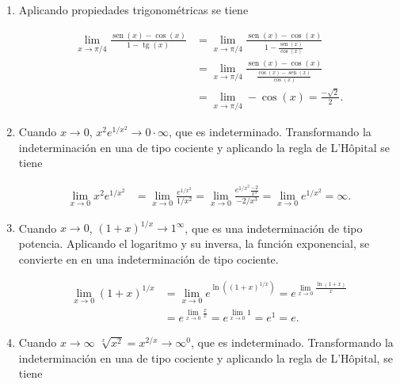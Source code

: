 \documentclass[
  spanish,
  a4paper,
]{scrreport}
\theoremstyle{definition}
\theoremstyle{remark}
\begin{document}
\begin{tcolorbox}
\begin{enumerate}
  \begin{align*}
  \lim_{x\to 0}\frac{\operatorname{sen}(x)-x}{x^3} 
  &= \lim_{x\to 0}\frac{\cos(x) -1}{3x^2} \tag{L'Hôpital} \\
  &= \lim_{x\to 0}\frac{-\sin(x)}{6x} \tag{L'Hôpital} \\
  &= \lim_{x\to 0}\frac{-\cos(x)}{6} \tag{L'Hôpital} \\
  &= -\frac{1}{6}.
  \end{align*}
\item
  Aplicando propiedades trigonométricas se tiene

  \begin{align*}
  \lim_{x\to \pi/4}\frac{\operatorname{sen}(x)-\cos(x)}{1-\operatorname{tg}(x)} &= \lim_{x\to \pi/4}\frac{\operatorname{sen}(x)-\cos(x)}{1-\frac{\operatorname{sen}(x)}{\cos(x)}}\\ 
  & = \lim_{x\to \pi/4}\frac{\operatorname{sen}(x)-\cos(x)}{\frac{\cos(x)-\operatorname{sen}(x)}{\cos(x)}}\\ 
  & = \lim_{x\to \pi/4} -\cos(x) = \frac{-\sqrt{2}}{2}.
  \end{align*}
\item
  Cuando \(x\to 0\), \(x^2e^{1/x^2}\to 0\cdot \infty\), que es
  indeterminado. Transformando la indeterminación en una de tipo
  cociente y aplicando la regla de L'Hôpital se tiene

  \begin{align*}
  \lim_{x\to 0}x^2e^{1/x^2} &= \lim_{x\to 0}\frac{e^{1/x^2}}{1/x^2} = \lim_{x\to 0}\frac{e^{1/x^2}\frac{-2}{x^3}}{-2/x^3} = \lim_{x\to 0} e^{1/x^2} =\infty.
  \end{align*}
\item
  Cuando \(x\to 0\), \(\left(1+x\right)^{1/x}\to 1^\infty\), que es una
  indeterminación de tipo potencia. Aplicando el logaritmo y su inversa,
  la función exponencial, se convierte en en una indeterminación de tipo
  cociente.

  \begin{align*}
  \lim_{x\to 0}\left(1+x\right)^{1/x} 
  &= \lim_{x\to 0}e^{\ln(\left(1+x\right)^{1/x})}
  = e^{\lim_{x\to 0}\frac{\ln(1+x)}{x}} \tag{$\ln(1+x)\approx x$}\\  
  &= e^{\lim_{x\to 0}\frac{x}{x}} 
  = e^{\lim_{x\to 0}1} 
  = e^1 
  = e.
  \end{align*}
\item
  Cuando \(x\to\infty\) \(\sqrt[x]{x^2}=x^{2/x}\to \infty^0\), que es
  indeterminado. Transformando la indeterminación en una de tipo
  cociente y aplicando la regla de L'Hôpital, se tiene


\end{enumerate}
\end{tcolorbox}
\end{document}
